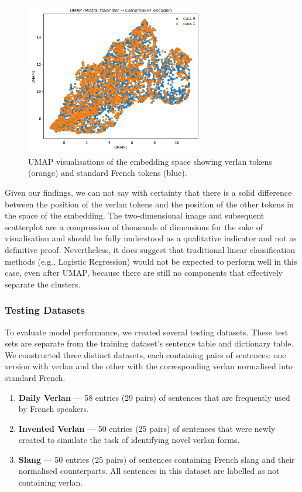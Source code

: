 \documentclass[12pt]{article}
\begin{document}
\begin{figure}[htbp]
    \centering
    \includegraphics[width=0.7\textwidth]{figures/mistral_bert_umap.png}
    \caption{UMAP visualisations of the embedding space showing verlan tokens (orange) and standard French tokens (blue).}
    \label{fig:umap_comparison}
\end{figure}

Given our findings, we can not say with certainty that there is a solid difference between the position of the verlan tokens and the position of the other tokens in the space of the embedding. 
The two-dimensional image and subsequent scatterplot are a compression of thousands of dimensions for the sake of visualisation and should be fully understood as a qualitative indicator and not as definitive proof. 
Nevertheless, it does suggest that traditional linear classification methods (e.g., Logistic Regression) would not be expected to perform well in this case, even after UMAP, because there are still no components that effectively separate the clusters.

\subsubsection{Testing Datasets}
To evaluate model performance, we created several testing datasets. 
These test sets are separate from the training dataset's sentence table and dictionary table. 
We constructed three distinct datasets, each containing pairs of sentences: one version with verlan and the other with the corresponding verlan normalised into standard French.

\begin{enumerate}
\item \textbf{Daily Verlan} --- 58 entries (29 pairs) of sentences that are frequently used by French speakers.
  \item \textbf{Invented Verlan} --- 50 entries (25 pairs) of sentences that were newly created to simulate the task of identifying novel verlan forms.
  \item \textbf{Slang} --- 50 entries (25 pairs) of sentences containing French slang and their normalised counterparts. All sentences in this dataset are labelled as not containing verlan.
\end{enumerate}
\end{document}
